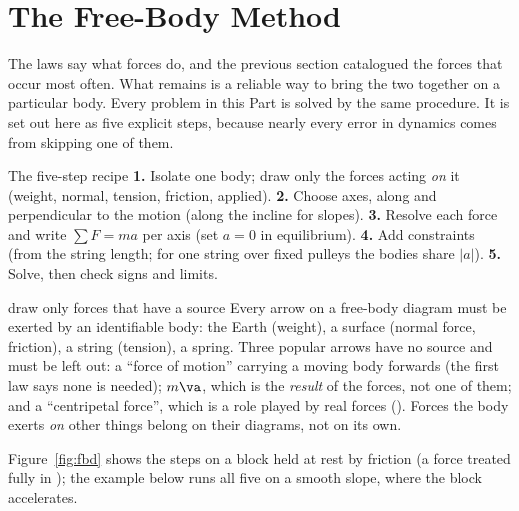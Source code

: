 \section{The Free-Body Method}

The laws say what forces do, and the previous section catalogued the forces that occur most often. What
remains is a reliable way to bring the two together on a particular body. Every problem in this Part is
solved by the same procedure. It is set out here as five explicit steps, because nearly every error in dynamics
comes from skipping one of them.

\begin{methodbox}{The five-step recipe}
\textbf{1.} Isolate one body; draw only the forces acting \emph{on} it (weight, normal, tension,
friction, applied). \textbf{2.} Choose axes, along and perpendicular to the motion (along the incline
for slopes). \textbf{3.} Resolve each force and write $\sum F=ma$ per axis (set $a=0$ in equilibrium).
\textbf{4.} Add constraints (from the string length; for one string over fixed pulleys the bodies
share $|a|$). \textbf{5.} Solve, then check signs and
limits.
\end{methodbox}

\begin{trapbox}{draw only forces that have a source}
Every arrow on a free-body diagram must be exerted by an identifiable body: the Earth (weight), a
surface (normal force, friction), a string (tension), a spring. Three popular arrows have no source and
must be left out: a ``force of motion'' carrying a moving body forwards (the first law says none is
needed); $m\va$, which is the \emph{result} of the forces, not one of them; and a ``centripetal force'',
which is a role played by real forces (). Forces the body exerts \emph{on} other
things belong on their diagrams, not on its own.
\end{trapbox}

\begin{figure}[htbp]
\centering
{}
\end{figure}

Figure~\ref{fig:fbd} shows the steps on a block held at rest by friction (a force treated fully in
); the example below runs all five on a smooth slope, where the block accelerates.

